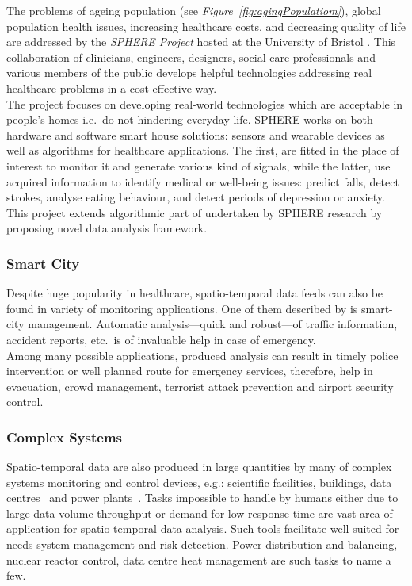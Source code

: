 \documentclass[11pt, a4paper, pdflatex, leqno, twoside, openright]{report}
\begin{document}
The problems of ageing population (see \emph{Figure~\ref{fig:agingPopulatiom}}), global population health issues, increasing healthcare costs, and decreasing quality of life are addressed by the \emph{SPHERE Project} hosted at the University of Bristol \citep{sphere}. This collaboration of clinicians, engineers, designers, social care professionals and various members of the public develops helpful technologies addressing real healthcare problems in a cost effective way.\\
The project focuses on developing real-world technologies which are acceptable in people's homes i.e.\ do not hindering everyday-life. SPHERE works on both hardware and software smart house solutions: sensors and wearable devices as well as algorithms for healthcare applications. The first, are fitted in the place of interest to monitor it and generate various kind of signals, while the latter, use acquired information to identify medical or well-being issues: predict falls, detect strokes, analyse eating behaviour, and detect periods of depression or anxiety.\\
This project extends algorithmic part of undertaken by SPHERE research by proposing novel data analysis framework.

      \subsubsection{Smart City}
Despite huge popularity in healthcare, spatio-temporal data feeds can also be found in variety of monitoring applications. One of them described by \citet{filipponi2010smart} is smart-city management. Automatic analysis---quick and robust---of traffic information, accident reports, etc.\ is of invaluable help in case of emergency.\\
Among many possible applications, produced analysis can result in timely police intervention or well planned route for emergency services, therefore, help in evacuation, crowd management, terrorist attack prevention and airport security control.

      \subsubsection{Complex Systems}
Spatio-temporal data are also produced in large quantities by many of complex systems monitoring and control devices, e.g.: scientific facilities, buildings, data centres~\citep{moore2005data} and power plants~\citep{amin2005toward}. 
Tasks impossible to handle by humans either due to large data volume throughput or demand for low response time are vast area of application for spatio-temporal data analysis. Such tools facilitate well suited for needs system management and risk detection. Power distribution and balancing, nuclear reactor control, data centre heat management are such tasks to name a few.
\end{document}
